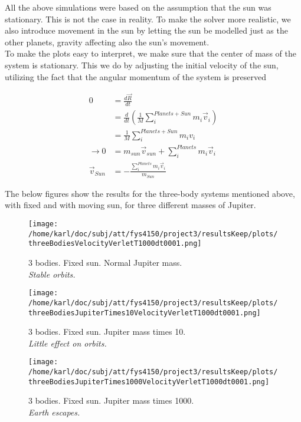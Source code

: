 \documentclass{article}
\begin{document}
All the above simulations were based on the assumption that the sun was stationary. This is not the case in reality. To make the solver more realistic, we also introduce movement in the sun by letting the sun be modelled just as the other planets, gravity affecting also the sun's movement. \\

To make the plots easy to interpret, we make sure that the center of mass of the system is stationary. This we do by adjusting the initial velocity of the sun, utilizing the fact that the angular momentum of the system is preserved

\begin{subequations}
	\begin{align}
	0 &= \frac{d \vec R}{dt}	\\
	&= \frac{d}{dt} (\frac{1}{M} \sum_i^{Planets+Sun} m_i \vec{v}_i)\\
	&= \frac{1}{M} \sum_i^{Planets+Sun} m_i v_i \\
	\rightarrow 0 &=m_{sun} \vec{v}_{sun} + \sum_i^{Planets} m_i \vec{v}_i \\
	\vec{v}_{Sun} &= - \frac{\sum_i^{Planets} m_i \vec{v}_i}{m_{Sun}}
	\end{align}
\end{subequations}

The below figures show the results for the three-body systems mentioned above, with fixed and with moving sun, for three different masses of Jupiter.

\begin{minipage}{.3\textwidth} 
	\begin{figure}[H]
		\centering
		\texttt{[image: /home/karl/doc/subj/att/fys4150/project3/resultsKeep/plots/threeBodiesVelocityVerletT1000dt0001.png]}
		\caption{3 bodies. Fixed sun. Normal Jupiter mass. \\ \textit{Stable orbits.}}
		\label{1}
	\end{figure}
\end{minipage}\hfill
\begin{minipage}{.3\textwidth} 
	\begin{figure}[H]
		\centering
		\texttt{[image: /home/karl/doc/subj/att/fys4150/project3/resultsKeep/plots/threeBodiesJupiterTimes10VelocityVerletT1000dt0001.png]}
		\caption{3 bodies. Fixed sun. Jupiter mass times 10. \\ \textit{Little effect on orbits.}}
		\label{1}
	\end{figure}
\end{minipage}\hfill
\begin{minipage}{.3\textwidth} 
	\begin{figure}[H]
		\centering
		\texttt{[image: /home/karl/doc/subj/att/fys4150/project3/resultsKeep/plots/threeBodiesJupiterTimes1000VelocityVerletT1000dt0001.png]}
		\caption{3 bodies. Fixed sun.  Jupiter mass times 1000. \\ \textit{Earth escapes.}}
		\label{1}
	\end{figure}
\end{minipage}\hfill
\vspace{2ex}
\end{document}
